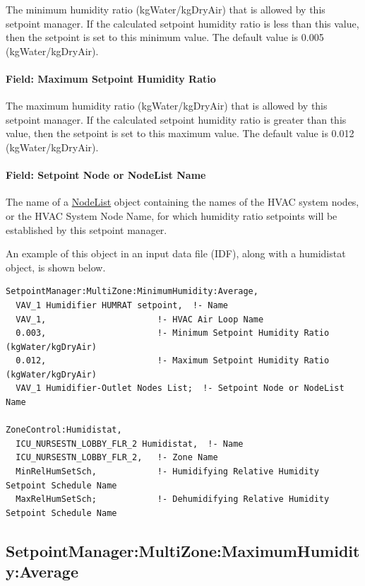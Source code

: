 The minimum humidity ratio (kgWater/kgDryAir) that is allowed by this setpoint manager. If the calculated setpoint humidity ratio is less than this value, then the setpoint is set to this minimum value. The default value is 0.005 (kgWater/kgDryAir).

\paragraph{Field: Maximum Setpoint Humidity Ratio}\label{field-maximum-setpoint-humidity-ratio-1}

The maximum humidity ratio (kgWater/kgDryAir) that is allowed by this setpoint manager. If the calculated setpoint humidity ratio is greater than this value, then the setpoint is set to this maximum value. The default value is 0.012 (kgWater/kgDryAir).

\paragraph{Field: Setpoint Node or NodeList Name}\label{field-setpoint-node-or-nodelist-name-15}

The name of a \hyperref[nodelist]{NodeList} object containing the names of the HVAC system nodes, or the HVAC System Node Name, for which humidity ratio setpoints will be established by this setpoint manager.

An example of this object in an input data file (IDF), along with a humidistat object, is shown below.

\begin{lstlisting}
SetpointManager:MultiZone:MinimumHumidity:Average,
  VAV_1 Humidifier HUMRAT setpoint,  !- Name
  VAV_1,                      !- HVAC Air Loop Name
  0.003,                      !- Minimum Setpoint Humidity Ratio (kgWater/kgDryAir)
  0.012,                      !- Maximum Setpoint Humidity Ratio (kgWater/kgDryAir)
  VAV_1 Humidifier-Outlet Nodes List;  !- Setpoint Node or NodeList Name

ZoneControl:Humidistat,
  ICU_NURSESTN_LOBBY_FLR_2 Humidistat,  !- Name
  ICU_NURSESTN_LOBBY_FLR_2,   !- Zone Name
  MinRelHumSetSch,            !- Humidifying Relative Humidity Setpoint Schedule Name
  MaxRelHumSetSch;            !- Dehumidifying Relative Humidity Setpoint Schedule Name
\end{lstlisting}

\subsection{SetpointManager:MultiZone:MaximumHumidity:Average}\label{setpointmanagermultizonemaximumhumidityaverage}


